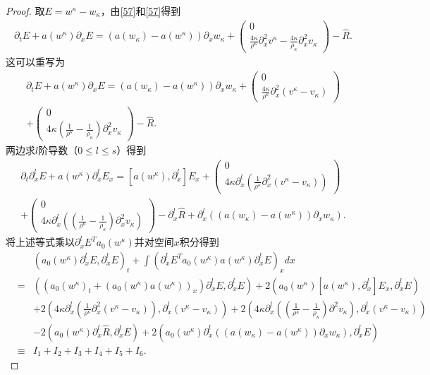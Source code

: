 \begin{proof}
取$E = w^\kappa - w_\kappa$，由\eqref{57}和\eqref{57}得到
\begin{eqnarray*}
  \partial_t E + a(w^\kappa) \partial_x E = (a(w_\kappa) - a(w^\kappa)) \partial_x w_\kappa + \left( \begin{array}{cc} 0 \\ \frac{4\kappa}{\rho^\kappa} \partial^2_x v^\kappa - \frac{4\kappa}{\rho_\kappa} \partial^2_x v_\kappa \end{array} \right) - \hat{R}.
\end{eqnarray*}
这可以重写为
\begin{eqnarray*}
   \partial_t E + a(w^\kappa) \partial_x E = (a(w_\kappa) - a(w^\kappa)) \partial_x w_\kappa + \left( \begin{array}{cc} 0 \\ \frac{4\kappa}{\rho^\kappa} \partial^2_x (v^\kappa - v_\kappa) \end{array} \right) \\
   + \left( \begin{array}{cc} 0 \\ 4\kappa(\frac{1}{\rho^\kappa} -\frac{1}{ \rho_\kappa})\partial^2_x v_\kappa \end{array} \right)- \hat{R}.
\end{eqnarray*}
两边求$l$阶导数（$0 \le l \le s$）得到
\begin{eqnarray*}
  \partial_t \partial^l_x E + a(w^\kappa) \partial^l_x E_x  = [a(w^\kappa),\partial^l_x] E_x  + \left( \begin{array}{cc} 0 \\4\kappa \partial^l_x(\frac{1}{\rho^\kappa} \partial^2_x (v^\kappa-v_\kappa)) \end{array} \right) \\  + \left( \begin{array}{cc} 0 \\ 4 \kappa \partial^l_x ((\frac{1}{\rho^\kappa} - \frac{1}{\rho_\kappa}) \partial^2_x v_\kappa) \end{array} \right) -\partial^l_x \hat{R} + \partial^l_x ((a(w_\kappa)-a(w^\kappa))\partial_x w_\kappa).
\end{eqnarray*}
将上述等式乘以$\partial^l_x E^Ta_0(w^\kappa)$并对空间$x$积分得到
\begin{eqnarray}\label{58}
&& (a_0(w^\kappa) \partial^l_x E,\partial^l_x E)_t + \int ( \partial^l_x E^T a_0(w^\kappa) a(w^\kappa) \partial^l_x E )_x dx \nonumber \\
&=&  ((a_0(w^\kappa)_t + (a_0(w^\kappa)a(w^\kappa))_x) \partial^l_x E,\partial^l_x E)
+ 2(a_0(w^\kappa)[a(w^\kappa),\partial^l_x] E_x,\partial^l_x E)\nonumber \\
&& + 2 (4\kappa \partial^l_x (\frac{1}{\rho^\kappa} \partial^2_x (v^\kappa-v_\kappa)),\partial^l_x (v^\kappa-v_\kappa)) + 2(4\kappa \partial^l_x ( (\frac{1}{\rho^\kappa}-\frac{1}{\rho_\kappa})\partial^2 v_\kappa),\partial^l_x (v^\kappa-v_\kappa)) \nonumber\\
&& - 2(a_0(w^\kappa)\partial^l_x\hat{R},\partial^l_x E)+ 2(a_0(w^\kappa)\partial^l_x((a(w_\kappa)-a(w^\kappa))\partial_x w_\kappa),\partial^l_x E) \nonumber \\
& \equiv& I_1 +I_2 +I_3 +I_4+I_5 + I_6.
\end{eqnarray}


\end{proof}
